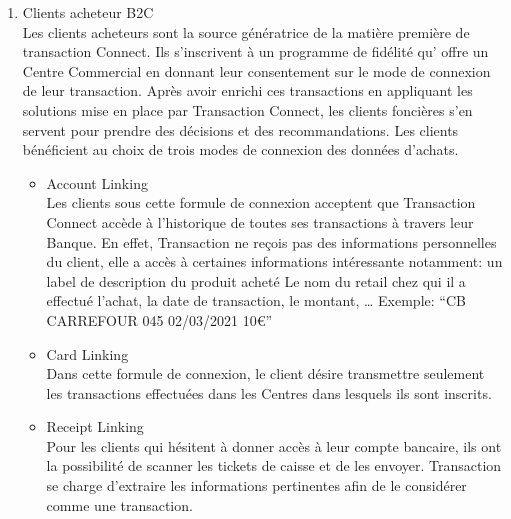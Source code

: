 \begin{enumerate}
\item Clients acheteur B2C\\
Les clients acheteurs sont la source génératrice de la matière première de transaction Connect. Ils s’inscrivent à un programme de fidélité qu' offre un Centre Commercial en donnant leur consentement sur le mode de connexion de leur transaction. Après avoir enrichi ces transactions en appliquant les solutions mise en place par Transaction Connect, les clients foncières s’en servent pour prendre des décisions et des recommandations. Les  clients bénéficient au choix de trois modes de connexion des données d’achats. 
\begin{itemize}
\item Account Linking\\
Les clients sous cette formule de connexion acceptent que Transaction Connect accède à l’historique de toutes ses transactions à travers leur Banque. En effet, Transaction ne reçois pas des informations personnelles du client, elle a accès à certaines informations intéressante notamment: un label de description du produit acheté
Le nom du retail chez qui il a effectué l’achat, la date de transaction, le montant, …
Exemple: “CB CARREFOUR 045 02/03/2021 10€”

\item Card Linking \\
Dans cette formule de connexion, le client désire transmettre seulement les transactions effectuées dans les Centres dans lesquels ils sont inscrits.
\item Receipt Linking \\
Pour les clients qui hésitent à donner accès à leur compte bancaire, ils ont la possibilité de scanner les tickets de caisse et de les envoyer. Transaction se charge d’extraire les informations pertinentes afin de le considérer comme une transaction.


\end{itemize}
\end{enumerate}
